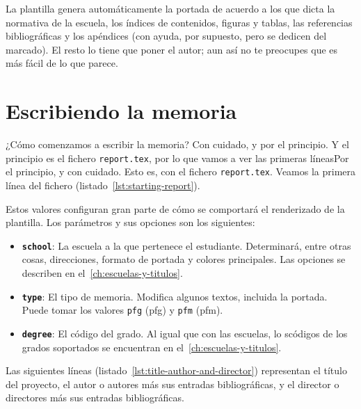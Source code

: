 \documentclass[%
    school=etsisi,%
    type=tfg,%
    degree=61CD,%
]{upm-report}
\begin{document}
La plantilla genera automáticamente la portada de acuerdo a los que
dicta la normativa de la escuela, los índices de contenidos, figuras y
tablas, las referencias bibliográficas y los apéndices (con ayuda, por
supuesto, pero se dedicen del marcado). El resto lo tiene que poner el
autor; aun así no te preocupes que es más fácil de lo que parece.

\chapter{Escribiendo la memoria}

¿Cómo comenzamos a escribir la memoria? Con cuidado, y por el principio.
Y el principio es el fichero \texttt{report.tex}, por lo que vamos a ver
las primeras líneasPor el principio, y con cuidado. Esto es, con el fichero \texttt{report.tex}. Veamos la primera línea del fichero (listado~\ref{lst:starting-report}).



Estos valores configuran gran parte de cómo se comportará el renderizado
de la plantilla. Los parámetros y sus opciones son los siguientes:

\begin{itemize}
    \item \textbf{\texttt{school}}: La escuela a la que pertenece el
        estudiante. Determinará, entre otras cosas, direcciones, formato
        de portada y colores principales. Las opciones se describen en
        el~\autoref{ch:escuelas-y-titulos}.
    \item \textbf{\texttt{type}}: El tipo de memoria. Modifica algunos textos, incluida la portada. Puede tomar los valores \texttt{pfg} (\acrlong{pfg}) y \texttt{pfm}  (\acrlong{pfm}).
    \item \textbf{\texttt{degree}}: El código del grado. Al igual que
    con las escuelas, lo scódigos de los grados soportados se encuentran
    en el~\autoref{ch:escuelas-y-titulos}.
\end{itemize}

Las siguientes líneas (listado~\ref{lst:title-author-and-director})
representan el título del proyecto, el autor o autores más sus entradas
bibliográficas, y el director o directores más sus entradas
bibliográficas.


\end{document}
